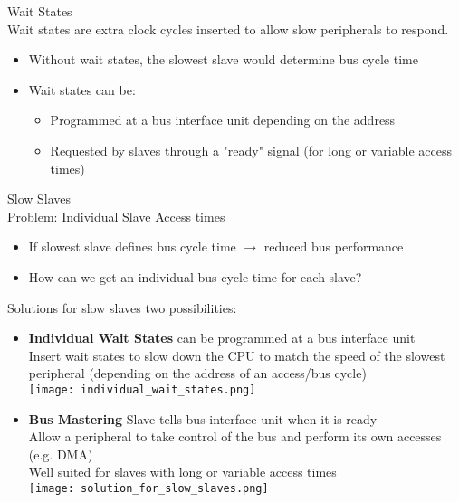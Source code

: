 \begin{definition}{Wait States}\\
Wait states are extra clock cycles inserted to allow slow peripherals to respond.
\begin{itemize}
    \item Without wait states, the slowest slave would determine bus cycle time
    \item Wait states can be:
    \begin{itemize}
        \item Programmed at a bus interface unit depending on the address
        \item Requested by slaves through a "ready" signal (for long or variable access times)
    \end{itemize}
\end{itemize}
\end{definition}

\begin{definition}{Slow Slaves}\\
    Problem: Individual Slave Access times
    \begin{itemize}
        \item If slowest slave defines bus cycle time $\rightarrow$ reduced bus performance
        \item How can we get an individual bus cycle time for each slave?
    \end{itemize}   
\end{definition}

\begin{concept}{Solutions for slow slaves} two possibilities:
    \begin{itemize}
        \item \textbf{Individual Wait States} can be programmed at a bus interface unit \\
        Insert wait states to slow down the CPU to match the speed of the slowest peripheral (depending on the address of an access/bus cycle)\\
        \texttt{[image: individual\_wait\_states.png]}
        \item \textbf{Bus Mastering} Slave tells bus interface unit when it is ready \\
        Allow a peripheral to take control of the bus and perform its own accesses (e.g. DMA)\\
        Well suited for slaves with long or variable access times\\
        \texttt{[image: solution\_for\_slow\_slaves.png]}
    \end{itemize}
\end{concept}

